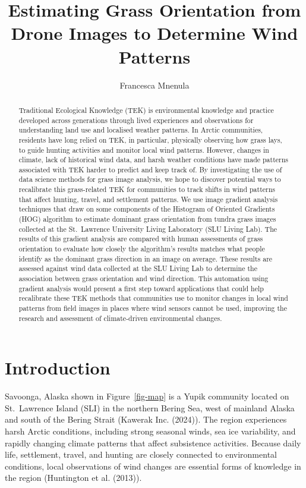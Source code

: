 \documentclass[
]{article}
\title{\textbf{Estimating Grass Orientation from Drone Images to
Determine Wind Patterns}}
\author{Francesca Mnenula}
\date{}
\renewcommand*\contentsname{Table of contents}
\newcommand\contentsname{Table of contents}
\begin{document}
\maketitle
\begin{abstract}
Traditional Ecological Knowledge (TEK) is environmental knowledge and
practice developed across generations through lived experiences and
observations for understanding land use and localised weather patterns.
In Arctic communities, residents have long relied on TEK, in particular,
physically observing how grass lays, to guide hunting activities and
monitor local wind patterns. However, changes in climate, lack of
historical wind data, and harsh weather conditions have made patterns
associated with TEK harder to predict and keep track of. By
investigating the use of data science methods for grass image analysis,
we hope to discover potential ways to recalibrate this grass-related TEK
for communities to track shifts in wind patterns that affect hunting,
travel, and settlement patterns. We use image gradient analysis
techniques that draw on some components of the Histogram of Oriented
Gradients (HOG) algorithm to estimate dominant grass orientation from
tundra grass images collected at the St.~Lawrence University Living
Laboratory (SLU Living Lab). The results of this gradient analysis are
compared with human assessments of grass orientation to evaluate how
closely the algorithm's results matches what people identify as the
dominant grass direction in an image on average. These results are
assessed against wind data collected at the SLU Living Lab to determine
the association between grass orientation and wind direction. This
automation using gradient analysis would present a first step toward
applications that could help recalibrate these TEK methods that
communities use to monitor changes in local wind patterns from field
images in places where wind sensors cannot be used, improving the
research and assessment of climate-driven environmental changes.
\end{abstract}

\renewcommand*\contentsname{Table of contents}
{
\setcounter{tocdepth}{4}
\tableofcontents
}

\section{Introduction}\label{introduction}

Savoonga, Alaska shown in Figure~\ref{fig-map} is a Yupik community
located on St.~Lawrence Island (SLI) in the northern Bering Sea, west of
mainland Alaska and south of the Bering Strait (Kawerak Inc. (2024)).
The region experiences harsh Arctic conditions, including strong
seasonal winds, sea ice variability, and rapidly changing climate
patterns that affect subsistence activities. Because daily life,
settlement, travel, and hunting are closely connected to environmental
conditions, local observations of wind changes are essential forms of
knowledge in the region (Huntington et al. (2013)).
\end{document}
